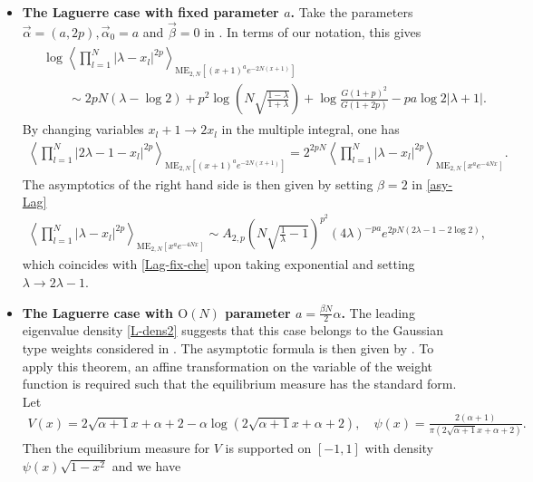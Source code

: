 \documentclass[11pt,a4paper]{article}
\numberwithin{equation}{section} %
\theoremstyle{plain}
\theoremstyle{definition}
\numberwithin{prop}{section}
\numberwithin{cor}{section}
\numberwithin{remark}{section}
\begin{document}
\begin{itemize}
    \item \textbf{The Laguerre case with fixed parameter $a$.}  Take the parameters $\vec{\alpha}=(a,2p),\vec{\alpha}_0=a$ and $\vec{\beta}=0$ in \cite[Proposition~7.2]{CG21}. In terms of our notation, this gives
    \begin{align}
        \begin{aligned}\label{Lag-fix-che}
        &\log\left\langle\prod_{l=1}^{N}|\lambda-x_l|^{2p}\right\rangle_{\mathrm{ME}_{2,N}[(x+1)^ae^{-2N(x+1)}]}\\
        &\qquad\sim 2pN(\lambda-\log 2)+p^2\log\left(N\sqrt{\frac{1-\lambda}{1+\lambda}}\right)+\log\frac{G(1+p)^2}{G(1+2p)}-pa\log 2|\lambda+1|.
        \end{aligned}
    \end{align}
    By changing variables $x_l+1\to2x_l $ in the multiple integral, one has
    \begin{align}
        \left\langle\prod_{l=1}^{N}|2\lambda-1-x_l|^{2p}\right\rangle_{\mathrm{ME}_{2,N}[(x+1)^ae^{-2N(x+1)}]}=2^{2pN}\left\langle\prod_{l=1}^{N}|\lambda-x_l|^{2p}\right\rangle_{\mathrm{ME}_{2,N}[x^ae^{-4Nx}]}.
    \end{align}
    The asymptotics of the right hand side is then given by setting $\beta=2$ in \eqref{asy-Lag}
    \begin{align}
        \left\langle\prod_{l=1}^{N}|\lambda-x_l|^{2p}\right\rangle_{\mathrm{ME}_{2,N}[x^ae^{-4Nx}]}\sim A_{2,p}\left(N\sqrt{\frac{1}{\lambda}-1}\right)^{p^2}(4\lambda)^{-pa}e^{2pN(2\lambda-1-2\log 2)},
    \end{align}
    which coincides with \eqref{Lag-fix-che} upon taking exponential and setting $\lambda\to2\lambda-1$.
    \item \textbf{The Laguerre case with $\mathrm{O}(N)$ parameter $a=\frac{\beta N}{2}\alpha$.} The leading eigenvalue density \eqref{L-dens2} suggests that this case belongs to the Gaussian type weights considered in \cite{CG21}. The asymptotic formula is then given by \cite[Theorem 1]{CG21}. To apply this theorem, an affine transformation on the variable of the weight function is required such that the equilibrium measure has the standard form. Let
    \begin{align*}
        V(x)=2\sqrt{\alpha+1}x+\alpha+2-\alpha\log(2\sqrt{\alpha+1}x+\alpha+2),\quad \psi(x)=\frac{2(\alpha+1)}{\pi(2\sqrt{\alpha+1}x+\alpha+2)}.
    \end{align*}
    Then the equilibrium measure for $V$ is supported on $[-1,1]$ with density $\psi(x)\sqrt{1-x^2}$ and we have

\end{itemize}
\end{document}
